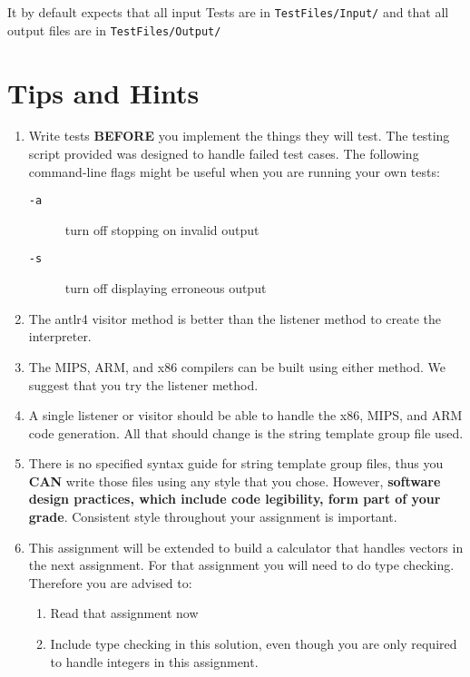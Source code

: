 \documentclass{article}
\begin{document}
		It by default expects that all input Tests are in \texttt{TestFiles/Input/} and that  all output files are in
		\texttt{TestFiles/Output/}




\section{Tips and Hints}

	\begin{enumerate}
		\item Write tests \textbf{BEFORE} you implement the things they will test. The testing script provided was
		designed to handle failed test cases.  The following command-line flags might be useful when you are running your own tests:
		\begin{description}
			\item[{\tt -a}] turn off stopping on invalid output
			\item[{\tt -s}]  turn off displaying erroneous output
		\end{description}
		\item The antlr4 visitor method is better than the listener method to create the interpreter.
		\item The MIPS, ARM, and x86 compilers can be built using either method. We suggest that you try the listener method.
		\item A single listener or visitor should be able to handle the x86, MIPS, and ARM code generation. All that should
		change is the string template group file used.
		\item There is no specified syntax guide for string template group files, thus you \textbf{CAN} write those files using
		any style that you chose. However, \textbf{software design practices, which include code legibility, form part of your grade}.
		Consistent style throughout your assignment is important.
		\item This assignment will be extended to build a calculator that handles vectors in the next assignment. For that assignment
		you will need to do type checking. Therefore you are advised to:
		\begin {enumerate}
			\item Read that assignment now
			\item Include type checking in this solution, even though you are only
			required to handle integers in this assignment.
		\end {enumerate}
	\end{enumerate}
\end{document}
